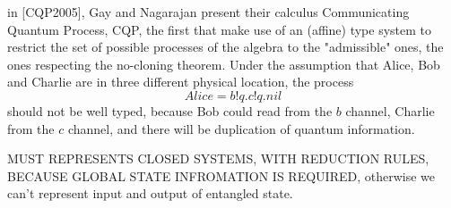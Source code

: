 in [CQP2005], Gay and Nagarajan present their calculus Communicating Quantum Process, CQP, the first that make use of an (affine) type system to restrict the set of possible processes of the algebra to the "admissible" ones, the ones respecting the no-cloning theorem. Under the assumption that Alice, Bob and Charlie are in three different physical location, the process \[Alice = b!q.c!q.nil\] should not be well typed, because Bob could read from the $b$ channel, Charlie from the $c$ channel, and there will be duplication of quantum information.



MUST REPRESENTS CLOSED SYSTEMS, WITH REDUCTION RULES, BECAUSE GLOBAL STATE INFROMATION IS REQUIRED, otherwise we can't represent input and output of entangled state. 


